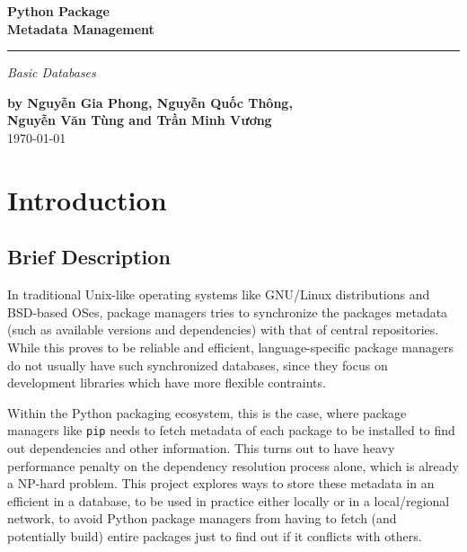 \documentclass[a4paper,12pt]{article}
\begin{document}
\setcounter{page}{0}
\thispagestyle{empty}
\begin{flushright}
  \setlength{\baselineskip}{1.4\baselineskip}
\textbf{\Huge Python Package\\Metadata Management}
  \noindent\rule{\textwidth}{5pt}
  \emph{\Large Basic Databases}

  \textbf{by Nguyễn Gia Phong, Nguyễn Quốc Thông,\\
          Nguyễn Văn Tùng and Trần Minh Vương\\}
  \today
\end{flushright}
\pagebreak

\tableofcontents
\pagebreak

\section{Introduction}
\subsection{Brief Description}
In traditional Unix-like operating systems like GNU/Linux distributions
and BSD-based OSes, package managers tries to synchronize the packages metadata
(such as available versions and dependencies) with that of central repositories.
While this proves to be reliable and efficient, language-specific
package managers do not usually have such synchronized databases,
since they focus on development libraries which have more flexible contraints.

Within the Python packaging ecosystem, this is the case, where package managers
like \verb|pip| needs to fetch metadata of each package to be installed
to find out dependencies and other information.  This turns out to have heavy
performance penalty on the dependency resolution process alone, which is
already a NP-hard problem.  This project explores ways to store these metadata
in an efficient in a database, to be used in practice either locally or in a
local/regional network, to avoid Python package managers from having to
fetch (and potentially build) entire packages just to find out if it conflicts
with others.

\end{document}
